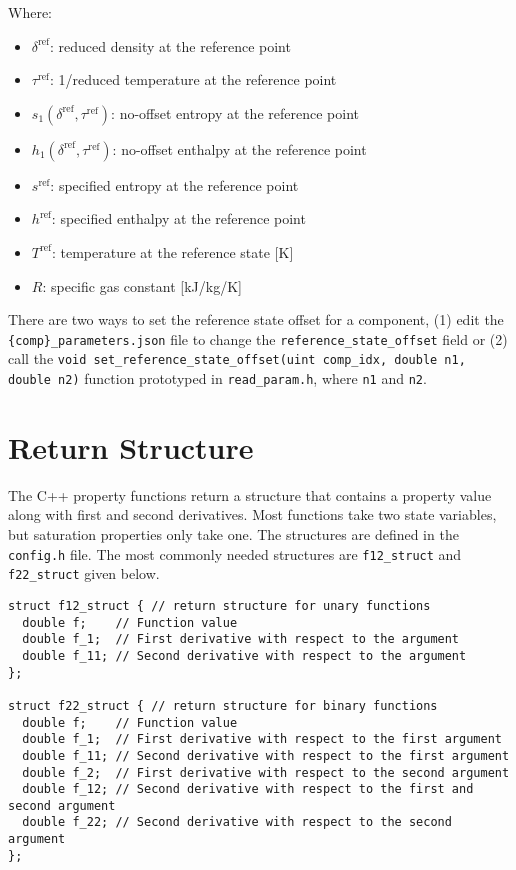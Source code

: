 \documentclass[oneside]{book}
\begin{document}
Where:
\begin{itemize}
	\item $\delta^{\text{ref}}$: reduced density at the reference point
	\item $\tau^{\text{ref}}$: 1/reduced temperature at the reference point
	\item $s_1(\delta^{\text{ref}}, \tau^{\text{ref}})$: no-offset entropy at the reference point
	\item $h_1(\delta^{\text{ref}}, \tau^{\text{ref}})$: no-offset enthalpy at the reference point
	\item $s^{\text{ref}}$: specified entropy at the reference point
	\item $h^{\text{ref}}$: specified enthalpy at the reference point
	\item $T^{\text{ref}}$: temperature at the reference state [K]
	\item $R$: specific gas constant [kJ/kg/K]
\end{itemize}

There are two ways to set the reference state offset for a component, (1) edit the \texttt{\{comp\}\_parameters.json} file to change the \texttt{reference\_state\_offset} field or (2) call the   
\texttt{void set\_reference\_state\_offset(uint comp\_idx, double n1, double n2)} function prototyped in \texttt{read\_param.h}, where \texttt{n1} and \texttt{n2}.

\section{Return Structure}

The C++ property functions return a structure that contains a property value along with first and second derivatives.  Most functions take two state variables, but saturation properties only take one.  The structures are defined in the \texttt{config.h} file. The most commonly needed structures are \texttt{f12\_struct} and \texttt{f22\_struct} given below.

\begin{verbatim}
struct f12_struct { // return structure for unary functions
  double f;    // Function value
  double f_1;  // First derivative with respect to the argument
  double f_11; // Second derivative with respect to the argument
};

struct f22_struct { // return structure for binary functions
  double f;    // Function value
  double f_1;  // First derivative with respect to the first argument
  double f_11; // Second derivative with respect to the first argument
  double f_2;  // First derivative with respect to the second argument
  double f_12; // Second derivative with respect to the first and second argument
  double f_22; // Second derivative with respect to the second argument
};
\end{verbatim}
\end{document}
